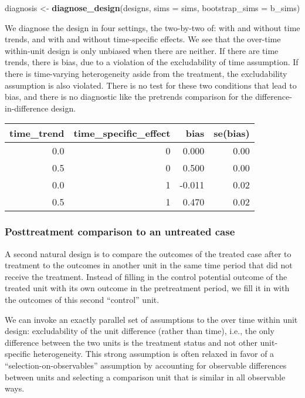 \documentclass[
]{article}
\newenvironment{Shaded}{\begin{snugshade}}{\end{snugshade}}
\newcommand{\DataTypeTok}[1]{\textcolor[rgb]{0.13,0.29,0.53}{#1}}
\newcommand{\KeywordTok}[1]{\textcolor[rgb]{0.13,0.29,0.53}{\textbf{#1}}}
\newcommand{\NormalTok}[1]{#1}
\newcommand{\StringTok}[1]{\textcolor[rgb]{0.31,0.60,0.02}{#1}}
\begin{document}
\begin{Shaded}
\begin{Highlighting}[]
\NormalTok{diagnosis <-}\StringTok{ }\KeywordTok{diagnose_design}\NormalTok{(designs, }\DataTypeTok{sims =}\NormalTok{ sims, }\DataTypeTok{bootstrap_sims =}\NormalTok{ b_sims)}
\end{Highlighting}
\end{Shaded}

We diagnose the design in four settings, the two-by-two of: with and
without time trends, and with and without time-specific effects. We see
that the over-time within-unit design is only unbiased when there are
neither. If there are time trends, there is bias, due to a violation of
the excludability of time assumption. If there is time-varying
heterogeneity aside from the treatment, the excludability assumption is
also violated. There is no test for these two conditions that lead to
bias, and there is no diagnostic like the pretrends comparison for the
difference-in-difference design.

\begin{tabular}{rrrr}
\toprule
time\_trend & time\_specific\_effect & bias & se(bias)\\
\midrule
0.0 & 0 & 0.000 & 0.00\\
0.5 & 0 & 0.500 & 0.00\\
0.0 & 1 & -0.011 & 0.02\\
0.5 & 1 & 0.470 & 0.02\\
\bottomrule
\end{tabular}

\hypertarget{posttreatment-comparison-to-an-untreated-case}{%
\subsubsection{Posttreatment comparison to an untreated
case}\label{posttreatment-comparison-to-an-untreated-case}}

A second natural design is to compare the outcomes of the treated case
after to treatment to the outcomes in another unit in the same time
period that did not receive the treatment. Instead of filling in the
control potential outcome of the treated unit with its own outcome in
the pretreatment period, we fill it in with the outcomes of this second
``control'' unit.

We can invoke an exactly parallel set of assumptions to the over time
within unit design: excludability of the unit difference (rather than
time), i.e., the only difference between the two units is the treatment
status and not other unit-specific heterogeneity. This strong assumption
is often relaxed in favor of a ``selection-on-observables'' assumption
by accounting for observable differences between units and selecting a
comparison unit that is similar in all observable ways.
\end{document}
